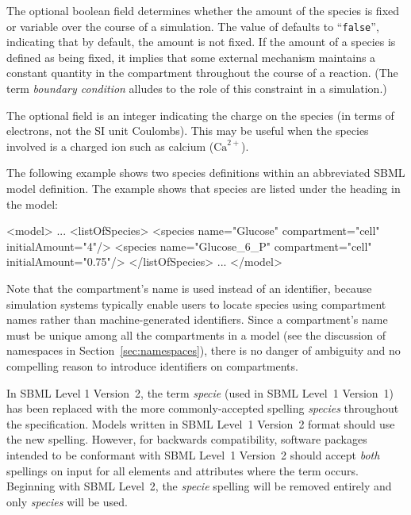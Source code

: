\documentclass[10pt]{cekarticle}
\newcommand{\changed}[1]{\textcolor{BrickRed}{#1}}
\newenvironment{blockChanged}{\color{BrickRed}}{}
\begin{document}
The optional boolean field  determines whether
the amount of the \changed{species} is fixed or variable over the course of
a simulation.  The value of  defaults to
``\texttt{false}'', indicating that by default, the amount is not fixed.
\changed{If the amount of a species is defined as being fixed, it
implies that some external mechanism maintains a constant quantity in the
compartment throughout the course of a reaction.  (The term \emph{boundary
  condition} alludes to the role of this constraint in a simulation.)}

The optional field  is an integer indicating the charge on
the species (in terms of electrons, not the SI unit Coulombs).  This may be
useful when the \changed{species} involved is a charged ion such as calcium
(\changed{$\text{Ca}^{2+}$}).

The following example shows two \changed{species} definitions within an
abbreviated SBML model definition.  The example shows that species are
listed under the heading  in the model:
\begin{example}
<model>
    ...
    <listOfSpecies>
        <species name="Glucose" compartment="cell" initialAmount="4"/>
        <species name="Glucose_6_P" compartment="cell" initialAmount="0.75"/>
    </listOfSpecies>
    ...
</model>
\end{example}

Note that the compartment's name is used instead of an identifier, because
simulation systems typically enable users to locate species using
compartment names rather than machine-generated identifiers.  Since a
compartment's name must be unique among all the compartments in a model
(see the discussion of namespaces in Section~\ref{sec:namespaces}), there
is no danger of ambiguity and no compelling reason to introduce identifiers
on compartments.

\begin{blockChanged}
  In SBML Level 1 Version~2, the term \emph{specie} (used in SBML Level~1
  Version~1) has been replaced with the more commonly-accepted spelling
  \emph{species} throughout the specification.  Models written in SBML
  Level~1 Version~2 format should use the new spelling.  However, for
  backwards compatibility, software packages intended to be conformant with
  SBML Level~1 Version~2 should accept \emph{both} spellings on input for
  all elements and attributes where the term occurs.  Beginning with SBML
  Level~2, the \emph{specie} spelling will be removed entirely and only
  \emph{species} will be used.
\end{blockChanged}
\end{document}
